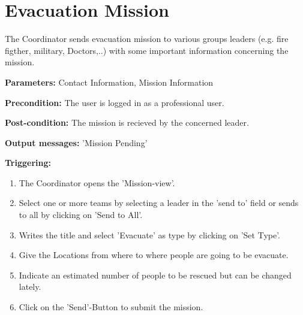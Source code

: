 \section{Evacuation Mission}
\label{operation:EvacuateMission}
The Coordinator sends evacuation mission to various groups leaders (e.g. fire
figther, military, Doctors,..) with some important information concerning the
mission.\\
\begin{description}
\item \textbf{Parameters:} Contact Information, Mission Information
\item \textbf{Precondition:} The user is logged in as a professional user.
\item \textbf{Post-condition:} The mission is recieved by the concerned leader.
\item \textbf{Output messages:} 'Mission Pending'
\item \textbf{Triggering:}
\begin{enumerate}
\item The Coordinator opens the 'Mission-view'.
\item Select one or more teams by selecting a leader in the 'send to' field or
sends to all by clicking on 'Send to All'.
\item Writes the title and select 'Evacuate' as type by clicking on 'Set
Type'.
\item Give the Locations from where to where people are going to be evacuate.
\item Indicate an estimated number of people to be rescued but can be changed
lately.
\item Click on the 'Send'-Button to submit the mission.
\end{enumerate}
\end{description}

